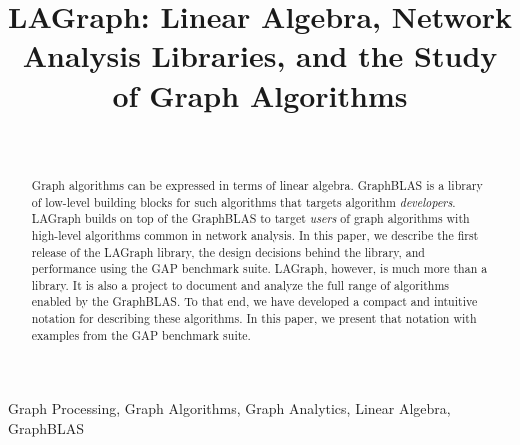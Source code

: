 \documentclass[conference]{IEEEtran}
\begin{document}
\title{LAGraph: Linear Algebra, Network Analysis Libraries, and the Study of Graph Algorithms}
\author{ %
 \\
}
\maketitle

\begin{abstract}

Graph algorithms can be expressed in terms of 
linear algebra. GraphBLAS is a library of low-level building blocks for such algorithms
that targets algorithm \emph{developers}.  LAGraph builds on top of the GraphBLAS to
target \emph{users} of graph algorithms with high-level algorithms common in network
analysis.   In this paper, we describe 
the first release of the LAGraph library, the design decisions behind the
library, and performance using the GAP benchmark suite.
LAGraph, however, is much more than a library. It is also a
project to document and analyze the full range of algorithms enabled by the GraphBLAS.  To that end,
we have developed a compact and intuitive notation for describing
these algorithms.  In this paper, we present that 
notation with examples from the GAP benchmark suite.  

\end{abstract}

\begin{IEEEkeywords}
Graph Processing, Graph Algorithms, Graph Analytics, Linear Algebra, GraphBLAS
\end{IEEEkeywords}



%

















\end{document}
